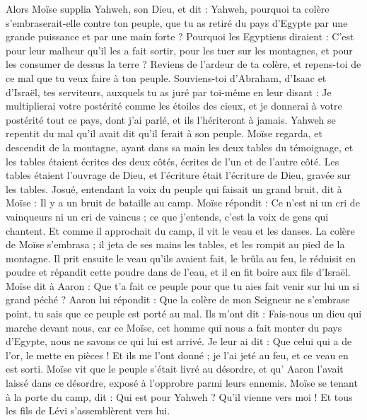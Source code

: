 \begin{multicols}{2}
Alors Moïse supplia Yahweh, son Dieu, et dit : Yahweh, pourquoi ta colère s'embraserait-elle contre ton peuple, que tu as retiré du pays d'Egypte par une grande puissance et par une main forte ?
Pourquoi les Egyptiens diraient : C’est pour leur malheur qu’il les a fait sortir, pour les tuer sur les montagnes, et pour les consumer de dessus la terre ? Reviens de l'ardeur de ta colère, et repens-toi de ce mal que tu veux faire à ton peuple.
Souviens-toi d'Abraham, d'Isaac et d'Israël, tes serviteurs, auxquels tu as juré par toi-même en leur disant : Je multiplierai votre postérité comme les étoiles des cieux, et je donnerai à votre postérité tout ce pays, dont j'ai parlé, et ils l'hériteront à jamais.
Yahweh se repentit du mal qu'il avait dit qu'il ferait à son peuple.
Moïse regarda, et descendit de la montagne, ayant dans sa main les deux tables du témoignage, et les tables étaient écrites des deux côtés, écrites de l’un et de l’autre côté.
Les tables étaient l'ouvrage de Dieu, et l'écriture était l'écriture de Dieu, gravée sur les tables.
Josué, entendant la voix du peuple qui faisait un grand bruit, dit à Moïse : Il y a un bruit de bataille au camp.
Moïse répondit : Ce n’est ni un cri de vainqueurs ni un cri de vaincus ; ce que j’entends, c’est la voix de gens qui chantent.
Et comme il approchait du camp, il vit le veau et les danses. La colère de Moïse s'embrasa ; il jeta de ses mains les tables, et les rompit au pied de la montagne.
Il prit ensuite le veau qu'ils avaient fait, le brûla au feu, le réduisit en poudre et répandit cette poudre dans de l'eau, et il en fit boire aux fils d'Israël.
Moïse dit à Aaron : Que t'a fait ce peuple pour que tu aies fait venir sur lui un si grand péché ?
Aaron lui répondit : Que la colère de mon Seigneur ne s'embrase point, tu sais que ce peuple est porté au mal.
Ils m'ont dit : Fais-nous un dieu qui marche devant nous, car ce Moïse, cet homme qui nous a fait monter du pays d'Egypte, nous ne savons ce qui lui est arrivé.
Je leur ai dit : Que celui qui a de l'or, le mette en pièces ! Et ils me l'ont donné ; je l'ai jeté au feu, et ce veau en est sorti.
Moïse vit que le peuple s’était livré au désordre, et qu’ Aaron l'avait laissé dans ce désordre, exposé à l’opprobre parmi leurs ennemis.
Moïse se tenant à la porte du camp, dit : Qui est pour Yahweh ? Qu'il vienne vers moi ! Et tous les fils de Lévi s'assemblèrent vers lui.

\end{multicols}
